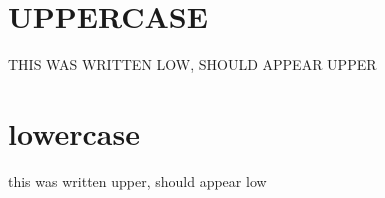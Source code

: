 \documentclass{article}
\begin{document}
\section{\MakeTextUppercase{Uppercase}}

\MakeTextUppercase{this was written low, should appear upper}

\section{\MakeTextLowercase{Lowercase}}

\MakeTextLowercase{THIS WAS WRITTEN UPPER, SHOULD APPEAR LOW}
\end{document}
